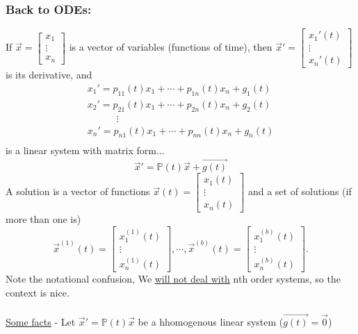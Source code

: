 \subsubsection*{Back to ODEs:}
If $\vec{x} = \begin{bmatrix}
	x_1\\ \vdots \\ x_n
\end{bmatrix}$ is a vector of variables (functions of time), then $\vec{x}' = \begin{bmatrix}
	x_1'(t)\\ \vdots \\ x_n'(t)
\end{bmatrix}$ is its derivative, and 
\begin{gather*}
	x_1' = p_{11}(t)x_1 + \cdots + p_{1n}(t)x_n + g_1(t)\\
			x_2' = p_{21}(t)x_1 + \cdots + p_{2n}(t)x_n + g_2(t)\\
			\quad \quad \quad \vdots\\
			x_n' = p_{n1}(t)x_1 + \cdots + p_{nn}(t)x_n + g_n(t)\\
\end{gather*}
is a linear system with matrix form...
\begin{equation*}
	\vec{x}' = \mathbb{P}(t)\vec{x} + \vec{g(t)}
\end{equation*}
A solution is a vector of functions $\vec{x}(t) = \begin{bmatrix}
	x_1(t)\\ \vdots \\ x_n(t)
\end{bmatrix}$ and a set of solutions (if more than one is)
\begin{equation*}
	\vec{x}^{(1)} (t) = 
	\begin{bmatrix}
		x_1^{(1)}(t)\\
		\vdots\\
		x_n^{(1)}(t)
	\end{bmatrix}, \cdots, 
	\vec{x}^{(b)} (t) = 
	\begin{bmatrix}
		x_1^{(b)}(t)\\
		\vdots\\
		x_n^{(b)}(t)
	\end{bmatrix}. 
\end{equation*}
Note the notational confusion, We \underline{will not deal with} nth order systems, so the context is nice.\\\\
\underline{Some facts} - Let $\vec{x}' = \mathbb{P}(t)\vec{x}$ be a hhomogenous linear system ($\vec{g(t)} = \vec{0}$)
